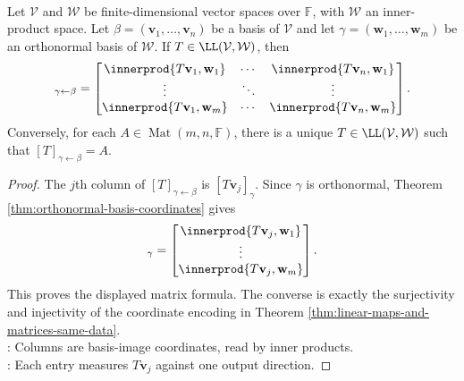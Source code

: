 \begin{theorem} \label{thm:matrix-entries-from-orthonormal-codomain} \\
Let $\mathcal{V}$ and $\mathcal{W}$ be finite-dimensional vector spaces over $\mathbb{F}$, with $\mathcal{W}$ an inner-product space. Let $\beta=(\mathbf{v}_1,\ldots,\mathbf{v}_n)$ be a basis of $\mathcal{V}$ and let $\gamma=(\mathbf{w}_1,\ldots,\mathbf{w}_m)$ be an orthonormal basis of $\mathcal{W}$. If $T\in\LL(\mathcal{V},\mathcal{W})$, then
\begin{align}
[T]_{\gamma\leftarrow\beta}
=\begin{bmatrix}
\innerprod{T\mathbf{v}_1,\mathbf{w}_1} & \cdots & \innerprod{T\mathbf{v}_n,\mathbf{w}_1}\\
\vdots & \ddots & \vdots\\
\innerprod{T\mathbf{v}_1,\mathbf{w}_m} & \cdots & \innerprod{T\mathbf{v}_n,\mathbf{w}_m}
\end{bmatrix}.
\nonumber
\end{align}
Conversely, for each $A\in\operatorname{Mat}(m,n,\mathbb{F})$, there is a unique $T\in\LL(\mathcal{V},\mathcal{W})$ such that $[T]_{\gamma\leftarrow\beta}=A$.
\begin{proof}
The $j$th column of $[T]_{\gamma\leftarrow\beta}$ is $[T\mathbf{v}_j]_{\gamma}$. Since $\gamma$ is orthonormal, Theorem \ref{thm:orthonormal-basis-coordinates} gives
\begin{align}
[T\mathbf{v}_j]_{\gamma}
=\begin{bmatrix}
\innerprod{T\mathbf{v}_j,\mathbf{w}_1}\\
\vdots\\
\innerprod{T\mathbf{v}_j,\mathbf{w}_m}
\end{bmatrix}.
\nonumber
\end{align}
This proves the displayed matrix formula. The converse is exactly the surjectivity and injectivity of the coordinate encoding in Theorem \ref{thm:linear-maps-and-matrices-same-data}.\\
: Columns are basis-image coordinates, read by inner products.\\
: Each entry measures $T\mathbf{v}_j$ against one output direction.
\end{proof}
\end{theorem}

